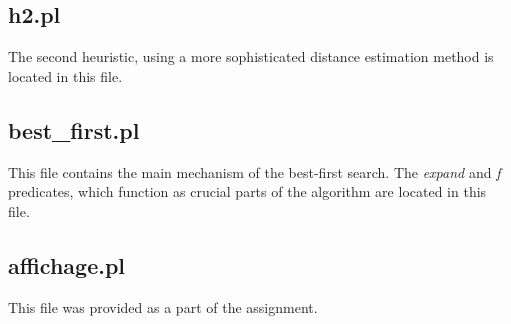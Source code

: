 \documentclass[12pt]{article}
\begin{document}
\subsection{h2.pl}
The second heuristic, using a more sophisticated distance estimation method is located in this file.
\subsection{best\_first.pl}
This file contains the main mechanism of the best-first search.  The \textit{expand} and \textit{f} predicates, which function as crucial parts of the algorithm are located in this file.
\subsection{affichage.pl}
This file was provided as a part of the assignment.
\end{document}
